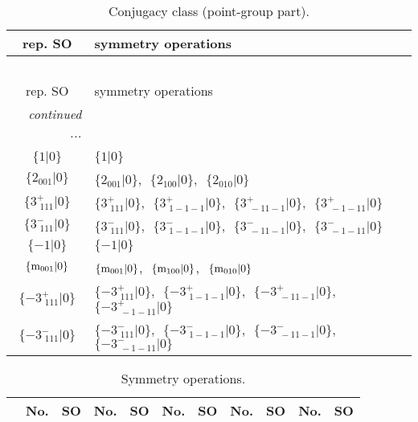 \documentclass[fleqn,10pt,landscape]{article}
\begin{document}
\begin{itemize}
\begin{center}
\renewcommand{\arraystretch}{1.3}
\begin{longtable}{c|l}
\caption{Conjugacy class (point-group part).}
 \\
 \hline \hline
rep. SO & symmetry operations \\ \hline \endfirsthead

\multicolumn{1}{l}{\tablename\ \thetable{}} \\
 \hline \hline
rep. SO & symmetry operations \\ \hline \endhead

 \hline \hline
\multicolumn{1}{r}{\footnotesize\it continued ...} \\ \endfoot

 \hline \hline
\multicolumn{1}{r}{} \\ \endlastfoot

$\{1|0\}$ & $\{1|0\}$ \\ \hline
$\{2{}_{001}|0\}$ & $\{2{}_{001}|0\}$,\,\, $\{2{}_{100}|0\}$,\,\, $\{2{}_{010}|0\}$ \\ \hline
$\{3^{+}_{\,\,111}|0\}$ & $\{3^{+}_{\,\,111}|0\}$,\,\, $\{3^{+}_{\,\,1-1-1}|0\}$,\,\, $\{3^{+}_{\,\,-11-1}|0\}$,\,\, $\{3^{+}_{\,\,-1-11}|0\}$ \\ \hline
$\{3^{-}_{\,\,111}|0\}$ & $\{3^{-}_{\,\,111}|0\}$,\,\, $\{3^{-}_{\,\,1-1-1}|0\}$,\,\, $\{3^{-}_{\,\,-11-1}|0\}$,\,\, $\{3^{-}_{\,\,-1-11}|0\}$ \\ \hline
$\{-1|0\}$ & $\{-1|0\}$ \\ \hline
$\{{\rm m}_{001}|0\}$ & $\{{\rm m}_{001}|0\}$,\,\, $\{{\rm m}_{100}|0\}$,\,\, $\{{\rm m}_{010}|0\}$ \\ \hline
$\{-3^{+}_{\,\,111}|0\}$ & $\{-3^{+}_{\,\,111}|0\}$,\,\, $\{-3^{+}_{\,\,1-1-1}|0\}$,\,\, $\{-3^{+}_{\,\,-11-1}|0\}$,\,\, $\{-3^{+}_{\,\,-1-11}|0\}$ \\ \hline
$\{-3^{-}_{\,\,111}|0\}$ & $\{-3^{-}_{\,\,111}|0\}$,\,\, $\{-3^{-}_{\,\,1-1-1}|0\}$,\,\, $\{-3^{-}_{\,\,-11-1}|0\}$,\,\, $\{-3^{-}_{\,\,-1-11}|0\}$ \\
\end{longtable}
\end{center}
\begin{center}
\renewcommand{\arraystretch}{1.3}
\begin{longtable}{c|cc|cc|cc|cc|cc}
\caption{Symmetry operations.}
 \\
 \hline \hline
 & No. & SO & No. & SO & No. & SO & No. & SO & No. & SO \\ \hline \endfirsthead


\end{longtable}
\end{center}
\end{itemize}
\end{document}
